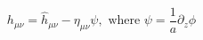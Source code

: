 \begin{equation}
h_{\mu \nu} = \hat{h}_{\mu \nu} - \eta_{\mu \nu} \psi, \, \, \mbox{where}
\, \, \psi = \frac{1}{a} \partial_z \phi
\end{equation}

